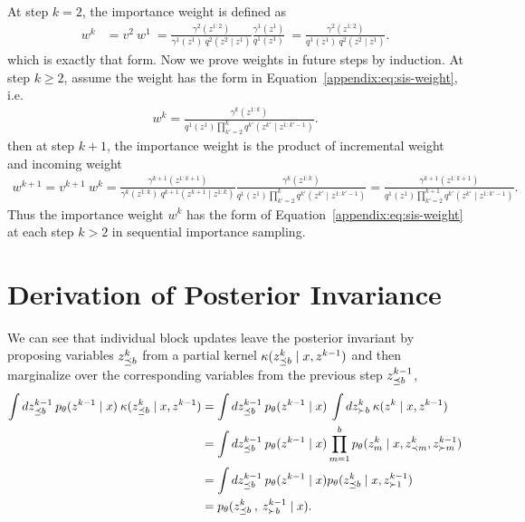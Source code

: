 \documentclass{article}
\theoremstyle{definition}
\begin{document}
At step $k=2$, the importance weight is defined as 
\begin{align*}
    w^k 
    &= 
    v^{2} \: w^1
    \: =
    \frac{\gamma^2(z^{1:2})}{\gamma^{1}(z^{1})\:q^2(z^2 \mid z^{1})} \frac{\gamma^1(z^1)}{q^1(z^1)}
    \: = \frac{\gamma^2(z^{1:2})}{q^1(z^1) \: q^2(z^2 \mid z^{1})}.
\end{align*}
which is exactly that form. Now we prove weights in future steps by induction. At step $k\geq 2$, assume the weight has the form in Equation~\ref{appendix:eq:sis-weight}, i.e.
\begin{align*}
    w^k
    = 
    \frac{\gamma^k(z^{1:k})}
         {q^1(z^1) \prod_{k'=2}^k q^{k'}(z^{k'} \mid z^{1:k'-1})}.    
\end{align*}
then at step $k+1$, the importance weight is the product of incremental weight and incoming weight 
\begin{align*}
    w^{k+1}
    =
    v^{k+1} \: w^k
    =
    \frac{\gamma^{k+1}(z^{1:k+1})}{\gamma^{k}(z^{1:k})\:q^{k+1}(z^{k+1} \mid z^{1:k})}
    \frac{\gamma^k(z^{1:k})}
         {q^1(z^1) \prod_{k'=2}^k q^{k'}(z^{k'} \mid z^{1:k'-1})}
    =
    \frac{\gamma^{k+1}(z^{1:k+1})}{q^1(z^1) \prod_{k'=2}^{k+1} q^{k'}(z^{k'} \mid z^{1:k'-1})}
    .    
\end{align*}
Thus the importance weight $w^k$ has the form of Equation~\ref{appendix:eq:sis-weight} at each step $k>2$ in sequential importance sampling.
\section{ Derivation of Posterior Invariance}
\label{appendix:posterior-invariance}
We can see that individual block updates leave the posterior invariant by proposing variables $z^k_{\preceq b}$ from a partial kernel $\kappa(z^k_{\preceq b} \mid x, z^{k-1})$ and then marginalize over the corresponding variables from the previous step $z^{k-1}_{\preceq b}$,
\begin{align*}
    \int 
    dz^{k-1}_{\preceq b} 
    \:
    p_\theta(z^{k-1} \mid x) 
    \: 
    \kappa(z^k_{\preceq b} \mid x, z^{k-1}) 
    &=
    \int 
    dz^{k-1}_{\preceq b} 
    \:
    p_\theta(z^{k-1} \mid x) 
    \: 
    \int dz^k_{\succ b}
    \:
    \kappa(z^k \mid x, z^{k-1})
    \\
    &= 
    \int 
    dz^{k-1}_{\preceq b} 
    \: 
    p_\theta(z^{k-1} \mid x)
    \prod_{m=1}^b p_\theta(z^k_m \mid x, z^{k}_{\prec m}, z^{k-1}_{\succ m})
    \\
    &=
    \int 
    dz^{k-1}_{\preceq b} 
    \: 
    p_\theta(z^{k-1} \mid x)
    p_\theta(z^k_{\preceq b} \mid x, z^{k-1}_{\succ 1})
    \\
    &=
    p_\theta(z^k_{\preceq b}\:, \: z^{k-1}_{\succ b} \mid x)
    .
\end{align*}
\end{document}
